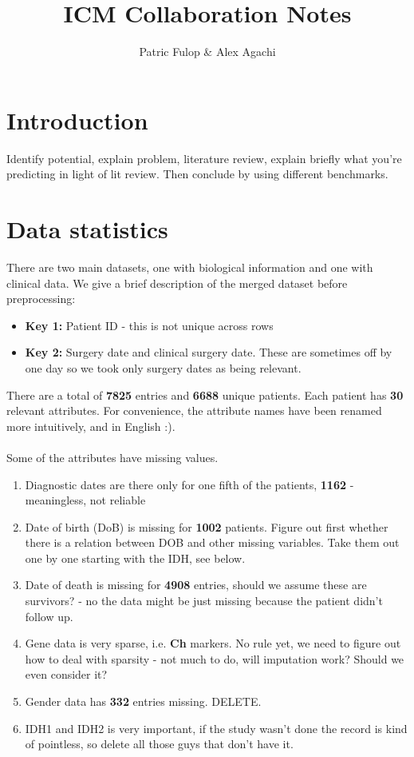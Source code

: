 \documentclass[a4paper]{article}
\title{ICM Collaboration Notes}
\author{Patric Fulop \& Alex Agachi}
\affil{The University of Edinburgh}
\begin{document}
\maketitle

\section{Introduction}
Identify potential, explain problem, literature review, explain briefly what you're predicting in light of lit review. Then conclude by using different benchmarks. 
\section{Data statistics}
There are two main datasets, one with biological information and one with clinical data. 
We give a brief description of the merged dataset before preprocessing:
%
\begin{itemize}
\item \textbf{Key 1:} Patient ID - this is not unique across rows 
\item \textbf{Key 2:} Surgery date and clinical surgery date. 
These are sometimes off by one day so we took only surgery dates as being relevant.
\end{itemize}
%
There are a total of \textbf{7825} entries and \textbf{6688} unique patients. Each patient has \textbf{30} relevant attributes. For convenience, the attribute names have been renamed more intuitively, and in English :). \\
\\
Some of the attributes have missing values.
\begin{enumerate}
\item Diagnostic dates are there only for one fifth of the patients,  \textbf{1162} - meaningless, not reliable
\item Date of birth (DoB) is missing for \textbf{1002} patients. Figure out first whether there is a relation between DOB and other missing variables. Take them out one by one starting with  the IDH, see below. 
\item Date of death is missing for \textbf{4908} entries, should we assume these are survivors? - no the data might be just missing because the patient didn't follow up. 
\item Gene data is very sparse, i.e. \textbf{Ch} markers. No rule yet, we need to figure out how to deal with sparsity - not much to do, will imputation work? Should we even consider it? 
\item Gender data has \textbf{332} entries missing. DELETE. 
\item IDH1 and IDH2 is very important, if the study wasn't done the record is kind of pointless, so delete all those guys that don't have it. 
\end{enumerate}
\end{document}
